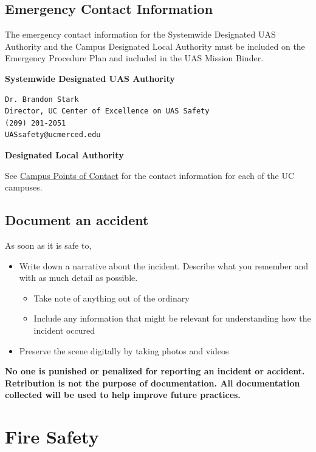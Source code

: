 \documentclass[
]{book}
\providecommand{\tightlist}{%
  \setlength{\itemsep}{0pt}\setlength{\parskip}{0pt}}
\begin{document}
\section{Emergency Contact Information}\label{emergency-contact-information}

The emergency contact information for the Systemwide Designated UAS Authority and the Campus Designated Local Authority must be included on the Emergency Procedure Plan and included in the UAS Mission Binder.

\textbf{Systemwide Designated UAS Authority}

\begin{verbatim}
Dr. Brandon Stark
Director, UC Center of Excellence on UAS Safety
(209) 201-2051
UASsafety@ucmerced.edu
\end{verbatim}

\textbf{Designated Local Authority}

See \href{https://ucdrones.github.io/ch-DLA.html}{Campus Points of Contact} for the contact information for each of the UC campuses.

\section{Document an accident}\label{document-an-accident}

As soon as it is safe to,

\begin{itemize}
\item
  Write down a narrative about the incident. Describe what you remember and with as much detail as possible.

  \begin{itemize}
  \tightlist
  \item
    Take note of anything out of the ordinary
  \item
    Include any information that might be relevant for understanding how the incident occured
  \end{itemize}
\item
  Preserve the scene digitally by taking photos and videos
\end{itemize}

\textbf{No one is punished or penalized for reporting an incident or accident. Retribution is not the purpose of documentation. All documentation collected will be used to help improve future practices.}

\chapter{Fire Safety}\label{fire-safety}
\end{document}

